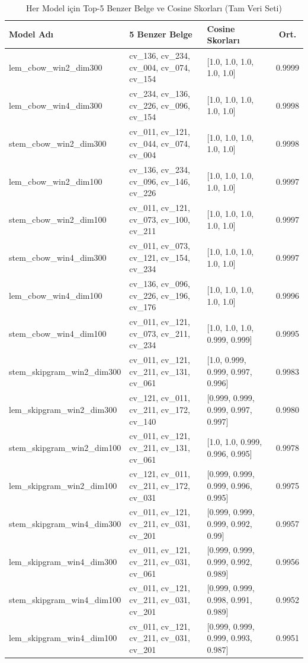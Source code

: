 \documentclass[12pt, a4paper]{article}
\begin{document}
\begin{table}[H]
\centering
\caption{Her Model için Top-5 Benzer Belge ve Cosine Skorları (Tam Veri Seti)}
\label{tab:model_karsilastirma_tam}
\footnotesize %
\begin{tabularx}{\textwidth}{l X X c}
\toprule
\textbf{Model Adı} & \textbf{5 Benzer Belge} & \textbf{Cosine Skorları} & \textbf{Ort.} \\
\midrule
lem\_cbow\_win2\_dim300 & cv\_136, cv\_234, cv\_004, cv\_074, cv\_154 & [1.0, 1.0, 1.0, 1.0, 1.0] & 0.9999 \\
lem\_cbow\_win4\_dim300 & cv\_234, cv\_136, cv\_226, cv\_096, cv\_154 & [1.0, 1.0, 1.0, 1.0, 1.0] & 0.9998 \\
stem\_cbow\_win2\_dim300 & cv\_011, cv\_121, cv\_044, cv\_074, cv\_004 & [1.0, 1.0, 1.0, 1.0, 1.0] & 0.9998 \\
lem\_cbow\_win2\_dim100 & cv\_136, cv\_234, cv\_096, cv\_146, cv\_226 & [1.0, 1.0, 1.0, 1.0, 1.0] & 0.9997 \\
stem\_cbow\_win2\_dim100 & cv\_011, cv\_121, cv\_073, cv\_100, cv\_211 & [1.0, 1.0, 1.0, 1.0, 1.0] & 0.9997 \\
stem\_cbow\_win4\_dim300 & cv\_011, cv\_073, cv\_121, cv\_154, cv\_234 & [1.0, 1.0, 1.0, 1.0, 1.0] & 0.9997 \\
lem\_cbow\_win4\_dim100 & cv\_136, cv\_096, cv\_226, cv\_196, cv\_176 & [1.0, 1.0, 1.0, 1.0, 1.0] & 0.9996 \\
stem\_cbow\_win4\_dim100 & cv\_011, cv\_121, cv\_073, cv\_211, cv\_234 & [1.0, 1.0, 1.0, 0.999, 0.999] & 0.9995 \\
stem\_skipgram\_win2\_dim300 & cv\_011, cv\_121, cv\_211, cv\_131, cv\_061 & [1.0, 0.999, 0.999, 0.997, 0.996] & 0.9983 \\
lem\_skipgram\_win2\_dim300 & cv\_121, cv\_011, cv\_211, cv\_172, cv\_140 & [0.999, 0.999, 0.999, 0.997, 0.997] & 0.9980 \\
stem\_skipgram\_win2\_dim100 & cv\_011, cv\_121, cv\_211, cv\_131, cv\_061 & [1.0, 1.0, 0.999, 0.996, 0.995] & 0.9978 \\
lem\_skipgram\_win2\_dim100 & cv\_121, cv\_011, cv\_211, cv\_172, cv\_031 & [0.999, 0.999, 0.999, 0.996, 0.995] & 0.9975 \\
stem\_skipgram\_win4\_dim300 & cv\_011, cv\_121, cv\_211, cv\_031, cv\_201 & [0.999, 0.999, 0.999, 0.992, 0.99] & 0.9957 \\
lem\_skipgram\_win4\_dim300 & cv\_011, cv\_121, cv\_211, cv\_031, cv\_061 & [0.999, 0.999, 0.999, 0.992, 0.989] & 0.9956 \\
stem\_skipgram\_win4\_dim100 & cv\_011, cv\_121, cv\_211, cv\_031, cv\_201 & [0.999, 0.999, 0.998, 0.991, 0.989] & 0.9952 \\
lem\_skipgram\_win4\_dim100 & cv\_011, cv\_121, cv\_211, cv\_031, cv\_201 & [0.999, 0.999, 0.999, 0.993, 0.987] & 0.9951 \\
\bottomrule
\end{tabularx}
\end{table}
\end{document}
